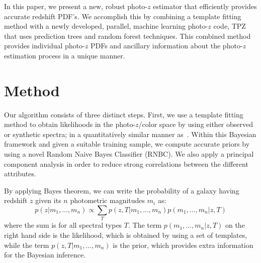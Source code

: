 In this paper, we present a new, robust photo-$z$ estimator that efficiently provides accurate redshift PDF's. We accomplish this by combining a template fitting method with a newly developed, parallel, machine learning photo-$z$ code, TPZ~\citep{Carrasco2013} that uses prediction trees and random forest techniques. This combined method provides individual photo-$z$ PDFs and ancillary information about the photo-$z$ estimation process in a unique manner.

\section{Method}

Our algorithm consists of three distinct steps. First, we use a template fitting method to obtain likelihoods in the photo-$z$/color space by using either observed or synthetic spectra; in a quantitatively similar manner as~\cite{Benitez2000}. Within this Bayesian framework and given a suitable training sample, we compute accurate priors by using a novel Random Naive Bayes Classifier (RNBC). We also apply a principal component analysis in order to reduce strong correlations between the different attributes. 

By applying Bayes theorem, we can write the probability of a galaxy having redshift $z$ given its $n$ photometric magnitudes $m_i$ as:
\begin{equation}\label{bayes}
p(z|m_1,...,m_n) \propto \sum_T p(z,T|m_1,...,m_n)p(m_1,...,m_n|z,T)
\end{equation}
where the sum is for all spectral types $T$. The term $p(m_1,...,m_n|z,T)$ on the right hand side is the likelihood, which is obtained by using a set of templates, while the term $p(z,T|m_1,...,m_n)$ is the prior, which provides extra information for the Bayesian inference. 

